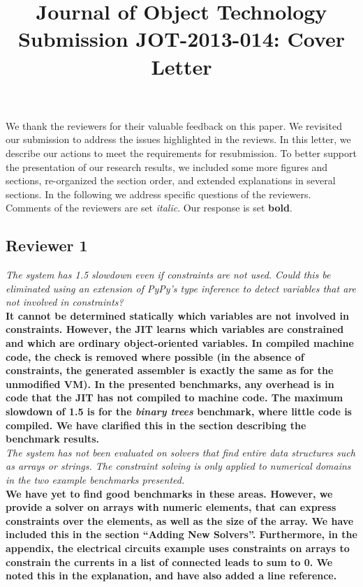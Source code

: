 \documentclass[english]{article}
\title{Journal of Object Technology Submission JOT-2013-014: Cover Letter}
\begin{document}
\maketitle
We thank the reviewers for their valuable feedback on this paper. We
revisited our submission to address the issues highlighted in the
reviews. In this letter, we describe our actions to meet the
requirements for resubmission.  To better support the presentation of
our research results, we
included some more figures and sections, re-organized the section
order, and extended explanations in several sections.  In the
following we address specific questions of the reviewers. Comments of
the reviewers are set \textit{italic}. Our response is set
\textbf{bold}.

\subsection*{Reviewer 1}
\textit{The system has 1.5 slowdown even if constraints are not used.
  Could this be eliminated using an extension of PyPy's type inference
  to detect variables that are not involved in constraints?}\\
\textbf{It cannot be determined statically which variables are not
  involved in constraints. However, the JIT learns which variables are
  constrained and which are ordinary object-oriented variables. In
  compiled machine code, the check is removed where possible (in the
  absence of constraints, the generated assembler is exactly the same
  as for the unmodified VM). In the presented benchmarks, any overhead
  is in code that the JIT has not compiled to machine code. The
  maximum slowdown of 1.5 is for the \emph{binary trees} benchmark,
  where little code is compiled. We have clarified this in the section
  describing the benchmark results.}\\

\textit{The system has not been evaluated on solvers that find entire
  data structures such as arrays or strings. The constraint solving is
  only applied to numerical domains in
  the two example benchmarks presented.}\\
\textbf{We have yet to find good benchmarks in these areas. However,
  we provide a solver on arrays with numeric elements, that can
  express constraints over the elements, as well as the size of the
  array. We have included this in the section ``Adding New
  Solvers''. Furthermore, in the appendix, the electrical circuits
  example uses constraints on arrays to constrain the currents in a
  list of connected leads to sum to 0. We noted this in the
  explanation, and have also added a line reference.}\\
\end{document}
